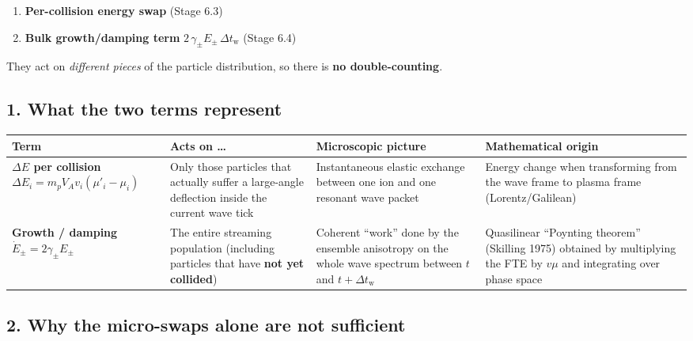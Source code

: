 {\begin{enumerate}
  \item \textbf{Per-collision energy swap} (Stage 6.3)
  \item \textbf{Bulk growth/damping term} $\displaystyle 2\,\gamma_{\pm}E_{\pm}\,\Delta t_{\mathrm w}$ (Stage 6.4)
\end{enumerate}

They act on \emph{different pieces} of the particle distribution, so there is \textbf{no double-counting}.

\subsection*{1. What the two terms represent}

\begin{table}[h!]
\centering
\renewcommand{\arraystretch}{1.4}
\begin{tabular}{|p{4cm}|p{4.5cm}|p{5cm}|p{5.5cm}|}
\hline
\textbf{Term} &
\textbf{Acts on …} &
\textbf{Microscopic picture} &
\textbf{Mathematical origin} \\
\hline
\makecell[l]{\textbf{$\Delta E$ per collision} \\[2pt]
$\displaystyle \Delta E_i = m_p V_A v_i (\mu'_i - \mu_i)$} &
Only those particles that actually suffer a large-angle deflection inside the current wave tick &
Instantaneous elastic exchange between one ion and one resonant wave packet &
Energy change when transforming from the wave frame to plasma frame (Lorentz/Galilean) \\
\hline
\makecell[l]{\textbf{Growth / damping} \\[2pt]
$\displaystyle \dot{E}_\pm = 2\gamma_\pm E_\pm$} &
The entire streaming population (including particles that have \textbf{not yet collided}) &
Coherent “work” done by the ensemble anisotropy on the whole wave spectrum between $t$ and $t + \Delta t_{\mathrm w}$ &
Quasilinear “Poynting theorem” (Skilling 1975) obtained by multiplying the FTE by $v\mu$ and integrating over phase space \\
\hline
\end{tabular}
\end{table}

\subsection*{2. Why the micro-swaps alone are not sufficient}

}
